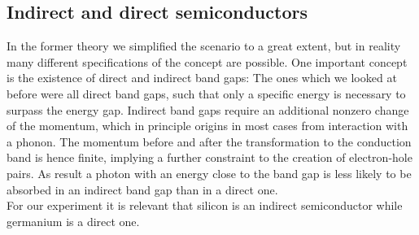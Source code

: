\subsection{Indirect and direct semiconductors}
In the former theory we simplified the scenario to a great extent, but in reality many 
different specifications of the concept are possible. One important concept is the existence
of direct and indirect band gaps: The ones which we looked at before were all direct band gaps, such
that only a specific energy is necessary to surpass the energy gap. Indirect band gaps require an additional
nonzero change of the momentum, which in principle origins in most cases from interaction with a phonon.
The momentum before and after the transformation to the conduction band is hence finite, implying
a further constraint to the creation of electron-hole pairs. As result a photon with an energy close to
the band gap is less likely to be absorbed in an indirect band gap than in a direct one. \\
For our experiment it is relevant that silicon is an indirect semiconductor while germanium is a direct one. 
\newcommand{\picwidththeo}{0.48\textwidth}

